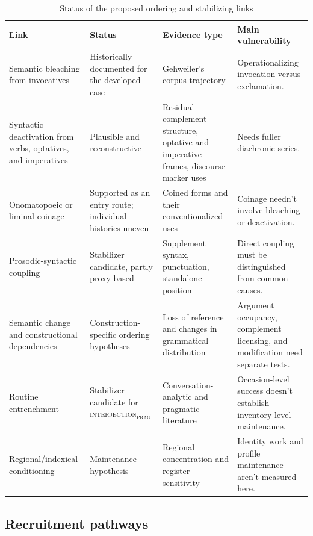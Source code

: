 \documentclass[12pt]{article}
\newcommand{\intj}[1]{\textsc{interjection\textsubscript{#1}}}
\begin{document}
\begin{table}[t]
\centering
\scriptsize
\caption{Status of the proposed ordering and stabilizing links}
\label{tab:link-status}
\begin{tabular}{@{}
  >{\raggedright\arraybackslash}p{}
  >{\raggedright\arraybackslash}p{}
  >{\raggedright\arraybackslash}p{}
  >{\raggedright\arraybackslash}p{}
  @{}}
\toprule
Link & Status & Evidence type & Main vulnerability \\
\midrule
Semantic bleaching from invocatives &
Historically documented for the developed case &
Gehweiler's corpus trajectory &
Operationalizing invocation versus exclamation. \\
\addlinespace
Syntactic deactivation from verbs, optatives, and imperatives &
Plausible and reconstructive &
Residual complement structure, optative and imperative frames, discourse-marker uses &
Needs fuller diachronic series. \\
\addlinespace
Onomatopoeic or liminal coinage &
Supported as an entry route; individual histories uneven &
Coined forms and their conventionalized uses &
Coinage needn't involve bleaching or deactivation. \\
\addlinespace
Prosodic-syntactic coupling &
Stabilizer candidate, partly proxy-based &
Supplement syntax, punctuation, standalone position &
Direct coupling must be distinguished from common causes. \\
\addlinespace
Semantic change and constructional dependencies &
Construction-specific ordering hypotheses &
Loss of reference and changes in grammatical distribution &
Argument occupancy, complement licensing, and modification need separate tests. \\
\addlinespace
Routine entrenchment &
Stabilizer candidate for \intj{prag} &
Conversation-analytic and pragmatic literature &
Occasion-level success doesn't establish inventory-level maintenance. \\
\addlinespace
Regional/indexical conditioning &
Maintenance hypothesis &
Regional concentration and register sensitivity &
Identity work and profile maintenance aren't measured here. \\
\bottomrule
\end{tabular}
\end{table}

\subsection{Recruitment pathways}\label{sec:recruitment}
\end{document}
